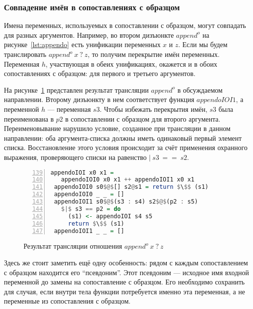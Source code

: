 
\subsubsection{Совпадение имён в сопоставлениях с образцом}

Имена переменных, используемых в сопоставлении с образцом, могут совпадать для разных аргументов.
Например, во втором дизъюнкте $append^o$ на рисунке~\ref{lst:appendo} есть унификации переменных $x$ и $z$.
Если мы будем транслировать $append^o \ x \ ? \ z$, то получим перекрытие имён переменных.
Переменная $h$, участвующая в обеих унификациях, окажется и в обоих сопоставлениях с образцом: для первого и третьего аргументов.

На рисунке~\ref{lst:appendoIOITR} представлен результат трансляции $append^o$ в обсуждаемом направлении.
Второму дизъюнкту в нем соответствует функция $appendoIOI1$, а переменной $h$ --- переменная $s3$.
Чтобы избежать перекрытия имён, $s3$ была переименована в $p2$ в сопоставлении с образцом для второго аргумента.
Переименовывание нарушило условие, созданное при трансляции в данном направлении: оба аргумента-списка должны иметь одинаковый первый элемент списка.
Восстановление этого условия происходит за счёт применения охранного выражения, проверяющего списки на равенство $|~s3~==~s2$.

\begin{figure}[h!]
  \begin{center}
  \begin{minipage}{0.85\textwidth}
  \begin{lstlisting}[language=Haskell, frame=single, numbers=left,numberstyle=\small, firstnumber=139, escapechar=|]
 appendoIOI x0 x1 =
   appendoIOI0 x0 x1 ++ appendoIOI1 x0 x1
 appendoIOI0 s0$@$[] s2@s1 = return $\$$ (s1)
 appendoIOI0 _ _ = []
 appendoIOI1 s0$@$(s3 : s4) s2$@$(p2 : s5)
   $|$ s3 == p2 = do
     (s1) <- appendoIOI s4 s5
     return $\$$ (s1)
 appendoIOI1 _ _ = []
    \end{lstlisting}
  \end{minipage}
  \end{center}
  \caption{Результат трансляции отношения $append^o \ x \ ? \ z$}
  \label{lst:appendoIOITR}
\end{figure}

Здесь же стоит заметить ещё одну особенность: рядом с каждым сопоставлением с образцом находится его ``псевдоним''.
Этот псевдоним --- исходное имя входной переменной до замены на сопоставление с образцом.
Его необходимо сохранить для случая, если внутри тела функции потребуется именно эта переменная, а не переменные из сопоставления с образцом.

